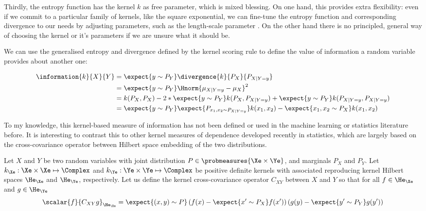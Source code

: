 Thirdly, the entropy function has the kernel $k$ as free parameter, which is mixed blessing. On one hand, this provides extra flexibility: even if we commit to a particular family of kernels, like the square exponential, we can fine-tune the entropy function and corresponding divergence to our needs by adjusting parameters, such as the length-scale parameter \citep{Song2008}. On the other hand there is no principled, general way of choosing the kernel or it's parameters if we are unsure what it should be. 

We can use the generalised entropy and divergence defined by the kernel scoring rule to define the value of information a random variable provides about another one:

\begin{align}
	\information{k}{X}{Y} &= \expect{y\sim P_{Y}} \divergence{k}{P_{X}}{P_{X\vert Y=y}}\\
		&=  \expect{y\sim P_{Y}} \Hnorm{ \mu_{X \vert Y=y} - \mu_X }^2 \label{eqn:kernel_information}\\
		&= k(P_{X},P_{X}) - 2*\expect{y\sim P_{Y}}k(P_{X},P_{X\vert Y=y}) + \expect{y\sim P_{Y}} k(P_{X\vert Y=y},P_{X\vert Y=y})\\
		&= \expect{y\sim P_{Y}} \expect{P_{x_1,x_2 \sim P_{X\vert Y=y}}}k(x_1,x_2) - \expect{x_1,x_2\sim P_{X}}k(x_1,x_2)
\end{align}

To my knowledge, this kernel-based measure of information has not been defined or used in the machine learning or statistics literature before. It is interesting to contrast this to other kernel measures of dependence developed recently in statistics, which are largely based on the cross-covariance operator between Hilbert space embedding of the two distributions.

\begin{definition}
	Let $X$ and $Y$ be two random variables with joint distribution $P\in\probmeasures{\Xe\times\Ye}$, and marginals $P_X$ and $P_Y$. Let $k_{\Xe}:\Xe\times\Xe\mapsto\Complex$ and $k_{\Ye}:\Ye\times\Ye\mapsto\Complex$ be positive definite kernels with associated reproducing kernel Hilbert spaces $\He_\Xe$ and $\He_\Ye$, respectively. Let us define the kernel cross-covariance operator $C_{XY}$ between $X$ and $Y$ so that for all $f\in\He_\Xe$ and $g\in\He_\Ye$
	\begin{equation}
		\scalar{f}{C_{XY}g}_{\He_\Xe} = \expect{(x,y) \sim P} \left( f(x) - \expect{x'\sim P_X} f(x')\right) \left( g(y) - \expect{y' \sim P_Y} g(y')\right)
	\end{equation}
\end{definition}


